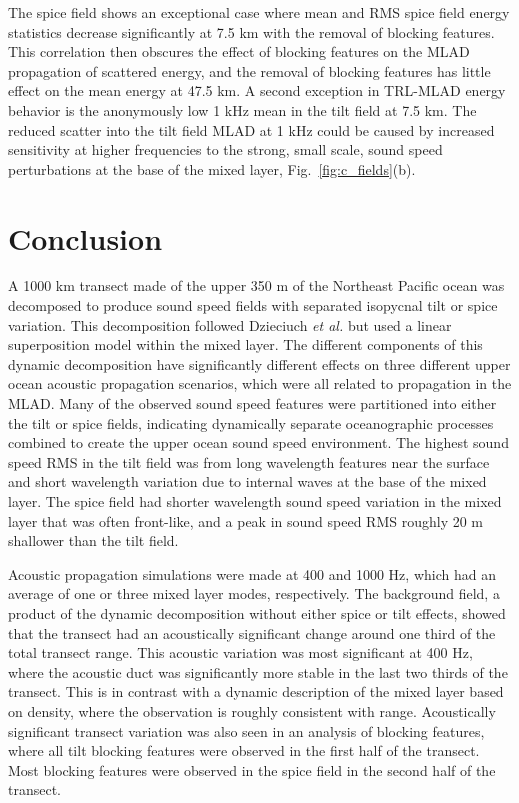 \documentclass[preprint,NumberedRefs]{JASA}
\begin{document}
The spice field shows an exceptional case where mean and RMS spice field energy statistics decrease significantly at 7.5 km with the removal of blocking features. This correlation then obscures the effect of blocking features on the MLAD propagation of scattered energy, and the removal of blocking features has little effect on the mean energy at 47.5 km. A second exception in TRL-MLAD energy behavior is the anonymously low 1 kHz mean in the tilt field at 7.5 km. The reduced scatter into the tilt field MLAD at 1 kHz could be caused by increased sensitivity at higher frequencies to the strong, small scale, sound speed perturbations at the base of the mixed layer, Fig.~\ref{fig:c_fields}(b).

\section{Conclusion}\label{sec:conclusion}
A 1000 km transect made of the upper 350 m of the Northeast Pacific ocean was decomposed to produce sound speed fields with separated isopycnal tilt or spice variation. This decomposition followed Dzieciuch \emph{et al.}\citep{dzieciuch2004} but used a linear superposition model within the mixed layer. The different components of this dynamic decomposition have significantly different effects on three different upper ocean acoustic propagation scenarios, which were all related to propagation in the MLAD. Many of the observed sound speed features were partitioned into either the tilt or spice fields, indicating dynamically separate oceanographic processes combined to create the upper ocean sound speed environment. The highest sound speed RMS in the tilt field was from long wavelength features near the surface and short wavelength variation due to internal waves at the base of the mixed layer. The spice field had shorter wavelength sound speed variation in the mixed layer that was often front-like, and a peak in sound speed RMS roughly 20 m shallower than the tilt field.

Acoustic propagation simulations were made at 400 and 1000 Hz, which had an average of one or three mixed layer modes, respectively. The background field, a product of the dynamic decomposition without either spice or tilt effects, showed that the transect had an acoustically significant change around one third of the total transect range. This acoustic variation was most significant at 400 Hz, where the acoustic duct was significantly more stable in the last two thirds of the transect. This is in contrast with a dynamic description of the mixed layer based on density\citep{cole2010seasonal}, where the observation is roughly consistent with range. Acoustically significant transect variation was also seen in an analysis of blocking features, where all tilt blocking features were observed in the first half of the transect. Most blocking features were observed in the spice field in the second half of the transect.
\end{document}
